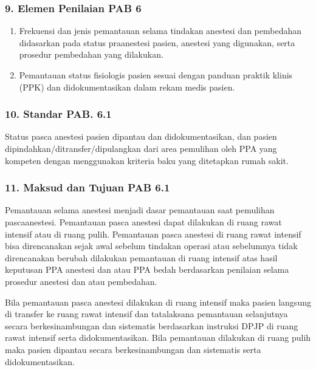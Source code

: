 \documentclass[
]{book}
\providecommand{\tightlist}{%
  \setlength{\itemsep}{0pt}\setlength{\parskip}{0pt}}
\begin{document}
\hypertarget{elemen-penilaian-pab-6}{%
\subsubsection*{9. Elemen Penilaian PAB 6}\label{elemen-penilaian-pab-6}}

\begin{enumerate}
\def\labelenumi{\alph{enumi}.}
\tightlist
\item
  Frekuensi dan jenis pemantauan selama tindakan anestesi dan pembedahan didasarkan pada status praanestesi pasien, anestesi yang digunakan, serta prosedur pembedahan yang dilakukan.
\item
  Pemantauan status fisiologis pasien sesuai dengan panduan praktik klinis (PPK) dan didokumentasikan dalam rekam medis pasien.
\end{enumerate}

\hypertarget{standar-pab.-6.1}{%
\subsubsection*{10. Standar PAB. 6.1}\label{standar-pab.-6.1}}

Status pasca anestesi pasien dipantau dan didokumentasikan, dan pasien dipindahkan/ditransfer/dipulangkan dari area pemulihan oleh PPA yang kompeten dengan menggunakan kriteria baku yang ditetapkan rumah sakit.

\hypertarget{maksud-dan-tujuan-pab-6.1}{%
\subsubsection*{11. Maksud dan Tujuan PAB 6.1}\label{maksud-dan-tujuan-pab-6.1}}

Pemantauan selama anestesi menjadi dasar pemantauan saat pemulihan pascaanestesi. Pemantauan pasca anestesi dapat dilakukan di ruang rawat intensif atau di ruang pulih. Pemantauan pasca anestesi di ruang rawat intensif bisa direncanakan sejak awal sebelum tindakan operasi atau sebelumnya tidak direncanakan berubah dilakukan pemantauan di ruang intensif atas hasil keputusan PPA anestesi dan atau PPA bedah berdasarkan penilaian selama prosedur anestesi dan atau pembedahan.

Bila pemantauan pasca anestesi dilakukan di ruang intensif maka pasien langsung di transfer ke ruang rawat intensif dan tatalaksana pemantauan selanjutnya secara berkesinambungan dan sistematis berdasarkan instruksi DPJP di ruang rawat intensif serta didokumentasikan. Bila pemantauan dilakukan di ruang pulih maka pasien dipantau secara berkesinambungan dan sistematis serta didokumentasikan.
\end{document}
